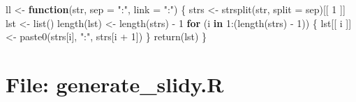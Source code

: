 \documentclass[
]{article}
\newenvironment{Shaded}{\begin{snugshade}}{\end{snugshade}}
\newcommand{\AttributeTok}[1]{\textcolor[rgb]{0.77,0.63,0.00}{#1}}
\newcommand{\ControlFlowTok}[1]{\textcolor[rgb]{0.13,0.29,0.53}{\textbf{#1}}}
\newcommand{\DecValTok}[1]{\textcolor[rgb]{0.00,0.00,0.81}{#1}}
\newcommand{\FunctionTok}[1]{\textcolor[rgb]{0.00,0.00,0.00}{#1}}
\newcommand{\NormalTok}[1]{#1}
\newcommand{\OtherTok}[1]{\textcolor[rgb]{0.56,0.35,0.01}{#1}}
\newcommand{\SpecialCharTok}[1]{\textcolor[rgb]{0.00,0.00,0.00}{#1}}
\newcommand{\StringTok}[1]{\textcolor[rgb]{0.31,0.60,0.02}{#1}}
\begin{document}
\begin{Shaded}
\begin{Highlighting}[]
\NormalTok{ll }\OtherTok{\textless{}{-}} \ControlFlowTok{function}\NormalTok{(str, }\AttributeTok{sep =} \StringTok{":"}\NormalTok{, }\AttributeTok{link =} \StringTok{":"}\NormalTok{) \{}
\NormalTok{  strs }\OtherTok{\textless{}{-}} \FunctionTok{strsplit}\NormalTok{(str, }\AttributeTok{split =}\NormalTok{ sep)[[ }\DecValTok{1}\NormalTok{ ]]}
\NormalTok{  lst }\OtherTok{\textless{}{-}} \FunctionTok{list}\NormalTok{()}
  \FunctionTok{length}\NormalTok{(lst) }\OtherTok{\textless{}{-}} \FunctionTok{length}\NormalTok{(strs) }\SpecialCharTok{{-}} \DecValTok{1}
  \ControlFlowTok{for}\NormalTok{ (i }\ControlFlowTok{in} \DecValTok{1}\SpecialCharTok{:}\NormalTok{(}\FunctionTok{length}\NormalTok{(strs) }\SpecialCharTok{{-}} \DecValTok{1}\NormalTok{)) \{}
\NormalTok{    lst[[ i ]] }\OtherTok{\textless{}{-}} \FunctionTok{paste0}\NormalTok{(strs[i], }\StringTok{":"}\NormalTok{, strs[i }\SpecialCharTok{+} \DecValTok{1}\NormalTok{])}
\NormalTok{  \}}
  \FunctionTok{return}\NormalTok{(lst)}
\NormalTok{\}}
\end{Highlighting}
\end{Shaded}

\hypertarget{file-generate_slidy.r}{%
\section{File: generate\_slidy.R}\label{file-generate_slidy.r}}
\end{document}
